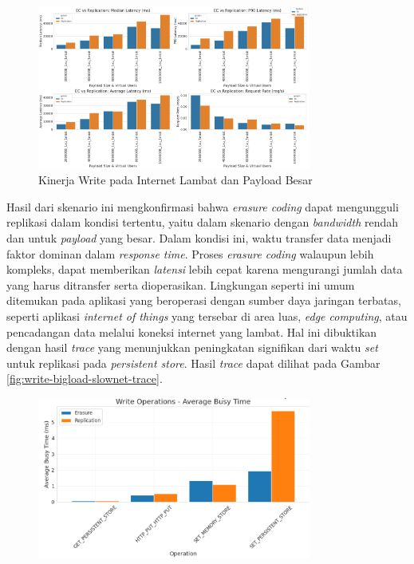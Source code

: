 \begin{enumerate}
  \begin{figure}[ht]
      \centering
      \includegraphics[width=0.8\textwidth]{resources/chapter-4/write_bigload_slownet.png}

      \caption{Kinerja Write pada Internet Lambat dan Payload Besar}
      \label{fig:write-bigload-slownet}
  \end{figure}

  Hasil dari skenario ini mengkonfirmasi bahwa \textit{erasure coding} dapat mengungguli replikasi dalam kondisi tertentu, yaitu dalam skenario dengan \textit{bandwidth} rendah dan untuk \textit{payload} yang besar. Dalam kondisi ini, waktu transfer data menjadi faktor dominan dalam \textit{response time}. Proses \textit{erasure coding} walaupun lebih kompleks, dapat memberikan \textit{latensi} lebih cepat karena mengurangi jumlah data yang harus ditransfer serta dioperasikan. Lingkungan seperti ini umum ditemukan pada aplikasi yang beroperasi dengan sumber daya jaringan terbatas, seperti aplikasi \textit{internet of things} yang tersebar di area luas, \textit{edge computing}, atau pencadangan data melalui koneksi internet yang lambat. Hal ini dibuktikan dengan hasil \textit{trace} yang menunjukkan peningkatan signifikan dari waktu \textit{set} untuk replikasi pada \textit{persistent store}. Hasil \textit{trace} dapat dilihat pada Gambar \ref{fig:write-bigload-slownet-trace}.

  \begin{figure}[ht]
      \centering
      \includegraphics[width=0.8\textwidth]{resources/chapter-4/write_bigload_slownet_trace.png}


\end{figure}
\end{enumerate}
